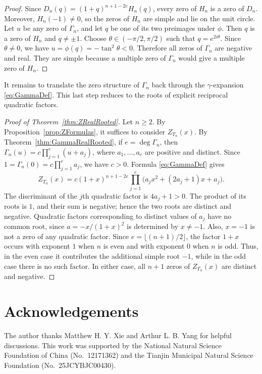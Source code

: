 \documentclass[11pt]{article}
\theoremstyle{plain}
\theoremstyle{remark}
\begin{document}
\begin{proof}
Since
$D_n(q)=(1+q)^{n+1-2e}H_n(q)$, every zero of $H_n$ is a zero of
$D_n$.  Moreover, $H_n(-1)\ne0$, so the zeros of $H_n$ are simple
and lie on the unit circle.  Let $u$ be any zero of $\Gamma_n$, and
let $q$ be one of its two preimages under $\phi$.  Then $q$ is a zero
of $H_n$ and $q\ne\pm1$.  Choose
$\theta\in(-\pi/2,\pi/2)$ such that $q=e^{2i\theta}$.  Since
$\theta\ne0$, we have $u=\phi(q)=-\tan^2\theta<0$.  Therefore all
zeros of $\Gamma_n$ are negative and real.  They are simple because a
multiple zero of $\Gamma_n$ would give a multiple zero of $H_n$.
\end{proof}

It remains to translate the zero structure of $\Gamma_n$ back through
the $\gamma$-expansion \eqref{eq:GammaDef}.  This last step reduces to
the roots of explicit reciprocal quadratic factors.

\begin{proof}[Proof of Theorem~\ref{thm:ZRealRooted}]
Let $n\ge2$.  By Proposition~\ref{prop:ZFormulas}, it suffices to
consider $Z_{T_n}(x)$.  By Theorem~\ref{thm:GammaRealRooted}, if
$e=\deg\Gamma_n$, then
$\Gamma_n(u)=c\prod_{j=1}^e(u+a_j)$, where
$a_1,\ldots,a_e$ are positive and distinct.  Since
$1=\Gamma_n(0)=c\prod_{j=1}^e a_j$, we have $c>0$.  Formula
\eqref{eq:GammaDef} gives
\[
Z_{T_n}(x)=c(1+x)^{n+1-2e}
\prod_{j=1}^e\bigl(a_jx^2+(2a_j+1)x+a_j\bigr).
\]
The discriminant of the $j$th quadratic factor is $4a_j+1>0$.
The product of its roots is $1$, and their sum is negative; hence the
two roots are distinct and negative.  Quadratic factors corresponding
to distinct values of $a_j$ have no common root, since
$a=-x/(1+x)^2$ is determined by $x\ne-1$.
Also, $x=-1$ is not a zero of any quadratic factor.  Since
$e=\lfloor(n+1)/2\rfloor$, the factor $1+x$ occurs with exponent $1$
when $n$ is even and with exponent $0$ when $n$ is odd.  Thus, in the
even case it contributes the additional simple root $-1$, while in
the odd case there is no such factor.  In either case, all $n+1$
zeros of $Z_{T_n}(x)$ are distinct and negative.
\end{proof}

\section*{Acknowledgements}
The author thanks Matthew H. Y. Xie and Arthur L. B. Yang for helpful
discussions.  This work was supported by the National Natural Science
Foundation of China (No.~12171362) and the Tianjin Municipal Natural
Science Foundation (No.~25JCYBJC00430).
\end{document}
